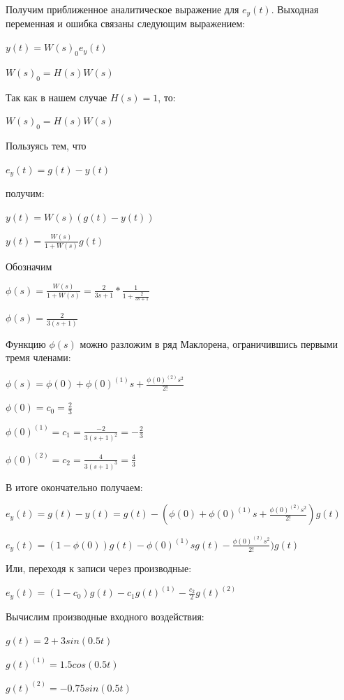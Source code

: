 \documentclass[a4paper, 11pt]{article}
\begin{document}
\par 
	Получим приближенное аналитическое выражение для $e_y(t)$. Выходная переменная и ошибка связаны следующим выражением:
\par 
$\displaystyle y(t)= W(s)_0e_y(t)$
\par 
$\displaystyle W(s)_0=H(s)W(s)$
\par 
Так как в нашем случае $H(s) = 1$, то:
\par 
$\displaystyle W(s)_0=H(s)W(s)$
\par 
Пользуясь тем, что 
\par 
$\displaystyle e_y(t)=g(t)-y(t)$
\par 
получим:
\par 
$\displaystyle y(t)=W(s)(g(t)-y(t))$
\par 
$y(t)=\displaystyle\frac{W(s)}{1+W(s)}g(t)$
\par 
Обозначим
\par 
$\phi(s)=\displaystyle\frac{W(s)}{1+W(s)}=\frac{2}{3s+1}*\frac{1}{1+\frac{2}{3s+1}}$
\par 
$\phi(s)=\displaystyle\frac{2}{3(s+1)}$
\par 
	Функцию $\phi(s)$ можно разложим в ряд Маклорена, ограничившись первыми тремя членами:
\par 
$\displaystyle \phi(s)=\phi(0)+\phi(0)^{(1)}s+\frac{\phi(0)^{(2)}s^2}{2!}$
\par 
$\displaystyle \phi(0)=c_0=\frac{2}{3}$
\par 
$\phi(0)^{(1)}=c_1=\displaystyle\frac{-2}{3(s+1)^2}=-\frac{2}{3}$
\par 
$\phi(0)^{(2)}=c_2=\displaystyle\frac{4}{3(s+1)^3}=\frac{4}{3}$
\par 
В итоге окончательно получаем:
\par 
$\displaystyle e_y(t)=g(t)-y(t)=g(t)-(\phi(0)+\phi(0)^{(1)}s+\frac{\phi(0)^{(2)}s^2}{2!})g(t)$
\par 
$\displaystyle e_y(t)=(1-\phi(0))g(t)-\phi(0)^{(1)}sg(t)-\frac{\phi(0)^{(2)}s^2}{2!})g(t)$
\par 
Или, переходя к записи через производные:
\par 
$\displaystyle e_y(t)=(1-c_0)g(t)-c_1g(t)^{(1)}-\frac{c_2}{2}g(t)^{(2)}$
\par 
Вычислим производные входного воздействия:
\par 
$\displaystyle g(t)=2+3sin(0.5t)$
\par 
$\displaystyle g(t)^{(1)}=1.5cos(0.5t)$
\par 
$\displaystyle g(t)^{(2)}=-0.75sin(0.5t)$
\par 
\end{document}
